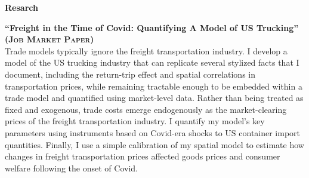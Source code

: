 \documentclass[10pt, oneside]{article}
\makeatletter
\newlength\tdima
\newcommand\tabfill[1]{%
      \setlength\tdima{\linewidth}%
      \addtolength\tdima{\@totalleftmargin}%
      \addtolength\tdima{-\dimen\@curtab}%
      \parbox[t]{\tdima}{#1\ifhmode\strut\fi}}
\newcommand\mytabs{\hspace*{1cm}\=\hspace{1cm}\=\hspace{1cm}\=\hspace{1cm}\=\hspace{1cm}\=\hspace{1cm}\=\hspace{1cm}\=\hspace{1cm}\=\hspace{1cm}\=\hspace{1cm}}
\newenvironment{mysec}[1][\mytabs]
  {\begin{tabbing}#1\kill\ignorespaces}
  {\end{tabbing}}
\makeatother
\begin{document}


\begin{minipage}[t]{0.1\linewidth}
\textbf{Resarch}
\end{minipage}\hspace{0.05\linewidth}
\begin{minipage}[t]{0.8\linewidth}
\textbf{``Freight in the Time of Covid: Quantifying A Model of US Trucking''\\ 
(\textsc{Job Market Paper})}\\ 

Trade models typically ignore the freight transportation industry. I develop a model of the US trucking industry that can replicate several stylized facts that I document, including the return-trip effect and spatial correlations in transportation prices, while remaining tractable enough to be embedded within a trade model and quantified using market-level data. Rather than being treated as fixed and exogenous, trade costs emerge endogenously as the market-clearing prices of the freight transportation industry. I quantify my model's key parameters using instruments based on Covid-era shocks to US container import quantities. Finally, I use a simple calibration of my spatial model to estimate how changes in freight transportation prices affected goods prices and consumer welfare following the onset of Covid.

\end{minipage}\vspace{5mm}
\end{document}
